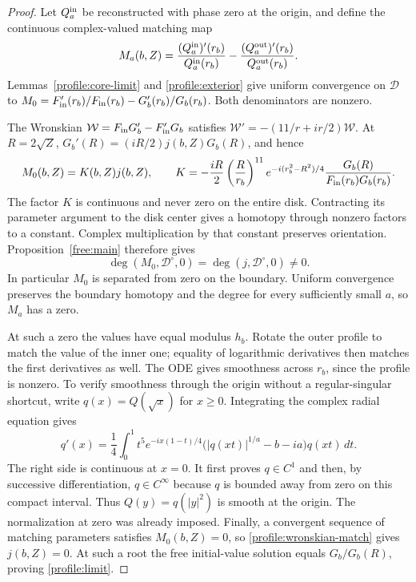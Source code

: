 \documentclass[11pt]{article}
\numberwithin{equation}{section}
\theoremstyle{definition}
\theoremstyle{remark}
\begin{document}
\begin{proof}
Let $Q^{\rm in}_a$ be reconstructed with phase zero at the origin, and
define the continuous complex-valued matching map
\[
 M_a(b,Z)=\frac{(Q^{\rm in}_a)'(r_b)}{Q^{\rm in}_a(r_b)}
       -\frac{(Q^{\rm out}_a)'(r_b)}{Q^{\rm out}_a(r_b)}.
\]
Lemmas~\ref{profile:core-limit} and \ref{profile:exterior} give uniform
convergence on $\mathcal D$ to
$M_0=F_{\rm in}'(r_b)/F_{\rm in}(r_b)-G_b'(r_b)/G_b(r_b)$.
Both denominators are nonzero.

The Wronskian $\mathcal W=F_{\rm in}G_b'-F_{\rm in}'G_b$ satisfies
$\mathcal W'=-(11/r+ir/2)\mathcal W$.  At $R=2\sqrt Z$,
$G_b'(R)=(iR/2)j(b,Z)G_b(R)$, and hence
\begin{equation}\label{profile:wronskian-match}
 M_0(b,Z)=K(b,Z)j(b,Z),\qquad
 K=-\frac{iR}{2}\left(\frac R{r_b}\right)^{11}
 e^{-i(r_b^2-R^2)/4}
 \frac{G_b(R)}{F_{\rm in}(r_b)G_b(r_b)}.
\end{equation}
The factor $K$ is continuous and never zero on the entire disk.
Contracting its parameter argument to the disk center gives a homotopy
through nonzero factors to a constant.  Complex multiplication by that
constant preserves orientation.  Proposition~\ref{free:main} therefore
gives
\[
 \deg(M_0,\mathcal D^\circ,0)
       =\deg(j,\mathcal D^\circ,0)\ne0.
\]
In particular $M_0$ is separated from zero on the boundary.  Uniform
convergence preserves the boundary homotopy and the degree for every
sufficiently small $a$, so $M_a$ has a zero.

At such a zero the values have equal modulus $h_b$.  Rotate the outer
profile to match the value of the inner one; equality of logarithmic
derivatives then matches the first derivatives as well.  The ODE gives
smoothness across $r_b$, since the profile is nonzero.  To verify
smoothness through the origin without a regular-singular shortcut,
write $q(x)=Q(\sqrt x)$ for $x\ge0$.  Integrating the complex radial
equation gives
\[
 q'(x)=\frac14\int_0^1t^5e^{-ix(1-t)/4}
       \big(|q(xt)|^{1/a}-b-ia\big)q(xt)\,dt.
\]
The right side is continuous at $x=0$.  It first proves $q\in C^1$ and
then, by successive differentiation, $q\in C^\infty$ because $q$ is
bounded away from zero on this compact interval.  Thus
$Q(y)=q(|y|^2)$ is smooth at the origin.  The normalization at zero was
already imposed.  Finally, a convergent sequence of matching parameters
satisfies $M_0(b,Z)=0$, so \eqref{profile:wronskian-match} gives
$j(b,Z)=0$.  At such a root the free initial-value solution equals
$G_b/G_b(R)$, proving \eqref{profile:limit}.
\end{proof}
\end{document}
